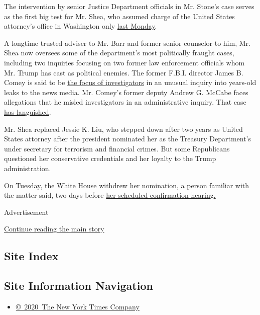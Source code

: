 The intervention by senior Justice Department officials in Mr. Stone's
case serves as the first big test for Mr. Shea, who assumed charge of
the United States attorney's office in Washington only
\href{https://www.justice.gov/opa/pr/attorney-general-william-p-barr-appoints-timothy-shea-interim-us-attorney-district-columbia}{last
Monday}.

A longtime trusted adviser to Mr. Barr and former senior counselor to
him, Mr. Shea now oversees some of the department's most politically
fraught cases, including two inquiries focusing on two former law
enforcement officials whom Mr. Trump has cast as political enemies. The
former F.B.I. director James B. Comey is said to be
\href{https://www.nytimes.com/2020/01/16/us/politics/leak-investigation-james-comey.html}{the
focus of investigators} in an unusual inquiry into years-old leaks to
the news media. Mr. Comey's former deputy Andrew G. McCabe faces
allegations that he misled investigators in an administrative inquiry.
That case
\href{https://www.nytimes.com/2019/10/01/us/politics/andrew-mccabe-judge-prosecutors.html}{has
languished}.

Mr. Shea replaced Jessie K. Liu, who stepped down after two years as
United States attorney after the president nominated her as the Treasury
Department's under secretary for terrorism and financial crimes. But
some Republicans questioned her conservative credentials and her loyalty
to the Trump administration.

On Tuesday, the White House withdrew her nomination, a person familiar
with the matter said, two days before
\href{https://www.banking.senate.gov/hearings/02/03/2020/nomination-hearing}{her
scheduled confirmation hearing.}

Advertisement

\protect\hyperlink{after-bottom}{Continue reading the main story}

\hypertarget{site-index}{%
\subsection{Site Index}\label{site-index}}

\hypertarget{site-information-navigation}{%
\subsection{Site Information
Navigation}\label{site-information-navigation}}

\begin{itemize}
\tightlist
\item
  \href{https://help.nytimes.com/hc/en-us/articles/115014792127-Copyright-notice}{©~2020~The
  New York Times Company}
\end{itemize}


